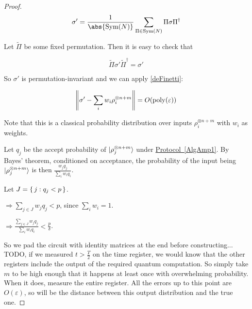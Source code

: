 \begin{proof}
	$$\sigma'=\frac{1}{\abs{\Sym(N)}}\sum_{\Pi\in\Sym(N)}\Pi\sigma\Pi^\dagger$$

	Let $\tilde{\Pi}$ be some fixed permutation. Then it is easy to check that

	$$\tilde{\Pi}\sigma'\tilde{\Pi}^\dagger=\sigma'$$

	So $\sigma'$ is permutation-invariant and we can apply \autoref{deFinetti}:

	$$\left\lVert\sigma'-\sum_i w_i\rho_i^{\otimes n+m}\right\rVert=O(\operatorname*{\operatorname{poly}}(\varepsilon))$$

	Note that this is a classical probability distribution over inputs $\rho_i^{\otimes n+m}$ with $w_i$ as weights.

	Let $q_j$ be the accept probability of $\ket{\rho_j^{\otimes n+m}}$ under \hyperref[AlgAmp1]{Protocol~\ref*{AlgAmp1}}. By Bayes' theorem, conditioned on acceptance, the probability of the input being $\ket{\rho_j^{\otimes n+m}}$ is then $\frac{w_j q_j}{\sum_i w_i q_i}$.

	Let $J=\set{j:q_j<p}$.

	$\Rightarrow\sum_{j\in J} w_j q_j<p$, since $\sum_i w_i=1$.

	$\Rightarrow\frac{\sum_{j\in J} w_j q_j}{\sum_i w_i q_i}<\frac{p}{\delta}$.

	So we pad the circuit with identity matrices at the end before constructing... TODO, if we measured $t>\frac{T}{2}$ on the time register, we would know that the other registers include the output of the required quantum computation. So simply take $m$ to be high enough that it happens at least once with overwhelming probability. When it does, measure the entire register. All the errors up to this point are $O(\varepsilon)$, so will be the distance between this output distribution and the true one.

\end{proof}
